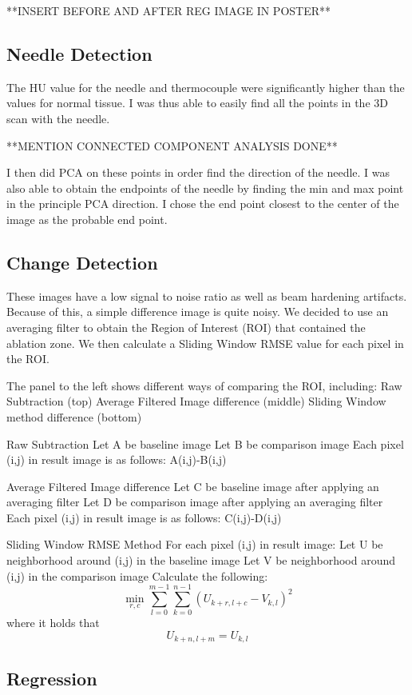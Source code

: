 \documentclass[]{spie}  %
\begin{document}
**INSERT BEFORE AND AFTER REG IMAGE IN POSTER**

\subsection{Needle Detection}

The HU value for the needle and thermocouple were significantly higher than the values for normal tissue. I was thus able to easily find all the points in the 3D scan with the needle. 

**MENTION CONNECTED COMPONENT ANALYSIS DONE**

I then did PCA on these points in order find the direction of the needle. I was also able to obtain the endpoints of the needle by finding the min and max point in the principle PCA direction. I chose the end point closest to the center of the image as the probable end point. 

\subsection{Change Detection}

These images have a low signal to noise ratio as well as beam hardening artifacts. Because of this, a simple difference image is quite noisy. We decided to use an averaging filter to obtain the Region of Interest (ROI) that contained the ablation zone. We then calculate a Sliding Window RMSE value for each pixel in the ROI. 

The panel to the left shows different ways of comparing the ROI, including:
Raw Subtraction (top)
Average Filtered Image difference (middle)
Sliding Window method difference (bottom)

Raw Subtraction
Let A be baseline image 
Let B be comparison image 
Each pixel (i,j) in result image is as follows: A(i,j)-B(i,j)

Average Filtered Image difference
Let C be baseline image after applying an averaging filter
Let D be comparison image after applying an averaging filter
Each pixel (i,j) in result image is as follows: C(i,j)-D(i,j)

Sliding Window RMSE Method
For each pixel (i,j) in result image: 
Let U be neighborhood around (i,j) in the baseline image
Let V be neighborhood around (i,j) in the comparison image
Calculate the following:
\[
\min_{r,c} \sum_{l=0}^{m-1} \sum_{k=0}^{n-1} {(U_{k+r,l+c}-V_{k,l})^2}
\]
where it holds that
\[
U_{k+n,l+m} = U_{k,l}
\]


\subsection{Regression}
\end{document}
